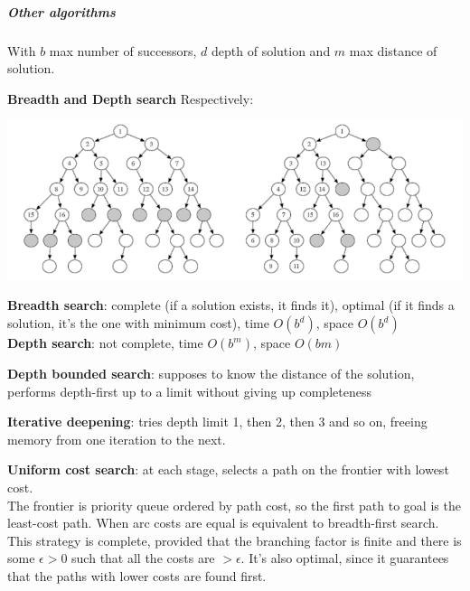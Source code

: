 \documentclass[10pt]{report}
\begin{document}
\subparagraph{Other algorithms} With $b$ max number of successors, $d$ depth of solution and $m$ max distance of solution. \begin{list}{}{}
	\item \textbf{Breadth and Depth search} Respectively:
		\begin{center}
			\includegraphics[scale=0.75]{4.png}
		\end{center}
		\textbf{Breadth search}: complete (if a solution exists, it finds it), optimal (if it finds a solution, it's the one with minimum cost), time $O(b^d)$, space $O(b^d)$\\
		\textbf{Depth search}: not complete, time $O(b^m)$, space $O(bm)$
	\item \textbf{Depth bounded search}: supposes to know the distance of the solution, performs depth-first up to a limit without giving up completeness
	\item \textbf{Iterative deepening}: tries depth limit 1, then 2, then 3 and so on, freeing memory from one iteration to the next.
	\item \textbf{Uniform cost search}: at each stage, selects a path on the frontier with lowest cost.\\
	The frontier is priority queue ordered by path cost, so the first path to goal is the least-cost path. When arc costs are equal is equivalent to breadth-first search.\\
	This strategy is complete, provided that the branching factor is finite and there is some $\epsilon > 0$ such that all the costs are $> \epsilon$. It's also optimal, since it guarantees that the paths with lower costs are found first.
\end{list}
\end{document}

